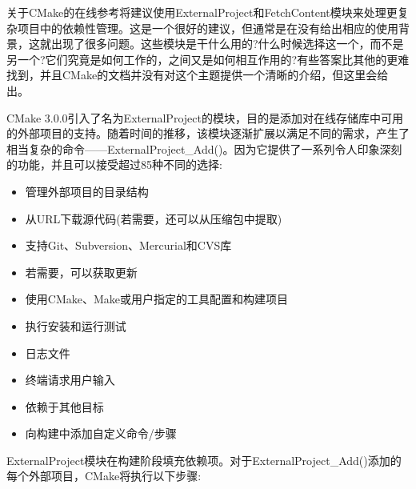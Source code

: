 
关于CMake的在线参考将建议使用ExternalProject和FetchContent模块来处理更复杂项目中的依赖性管理。这是一个很好的建议，但通常是在没有给出相应的使用背景，这就出现了很多问题。这些模块是干什么用的?什么时候选择这一个，而不是另一个?它们究竟是如何工作的，之间又是如何相互作用的?有些答案比其他的更难找到，并且CMake的文档并没有对这个主题提供一个清晰的介绍，但这里会给出。


CMake 3.0.0引入了名为ExternalProject的模块，目的是添加对在线存储库中可用的外部项目的支持。随着时间的推移，该模块逐渐扩展以满足不同的需求，产生了相当复杂的命令——ExternalProject\_Add()。因为它提供了一系列令人印象深刻的功能，并且可以接受超过85种不同的选择:

\begin{itemize}
\item 
管理外部项目的目录结构

\item 
从URL下载源代码(若需要，还可以从压缩包中提取)

\item 
支持Git、Subversion、Mercurial和CVS库

\item 
若需要，可以获取更新

\item 
使用CMake、Make或用户指定的工具配置和构建项目

\item 
执行安装和运行测试

\item 
日志文件

\item 
终端请求用户输入

\item 
依赖于其他目标

\item 
向构建中添加自定义命令/步骤
\end{itemize}

ExternalProject模块在构建阶段填充依赖项。对于ExternalProject\_Add()添加的每个外部项目，CMake将执行以下步骤:


